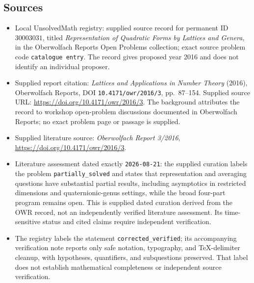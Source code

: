 \documentclass[11pt]{article}
\begin{document}
\subsection{Sources}
\begin{itemize}
\item Local UnsolvedMath registry: supplied source record for permanent ID \(30003031\), titled \emph{Representation of Quadratic Forms by Lattices and Genera}, in the Oberwolfach Reports Open Problems collection; exact source problem code \texttt{catalogue entry}. The record gives proposed year 2016 and does not identify an individual proposer.
\item Supplied report citation: \emph{Lattices and Applications in Number Theory} (2016), Oberwolfach Reports, DOI \texttt{10.4171/owr/2016/3}, pp.\ 87--154. Supplied source URL: \url{https://doi.org/10.4171/owr/2016/3}. The background attributes the record to workshop open-problem discussions documented in Oberwolfach Reports; no exact problem page or passage is supplied.
\item Supplied literature source: \emph{Oberwolfach Report 3/2016}, \url{https://doi.org/10.4171/owr/2016/3}.
\item Literature assessment dated exactly \texttt{2026-08-21}: the supplied curation labels the problem \texttt{partially\_solved} and states that representation and averaging questions have substantial partial results, including asymptotics in restricted dimensions and quaternionic-genus settings, while the broad four-part program remains open. This is supplied dated curation derived from the OWR record, not an independently verified literature assessment. Its time-sensitive status and cited claims require independent verification.
\item The registry labels the statement \texttt{corrected\_verified}; its accompanying verification note reports only safe notation, typography, and TeX-delimiter cleanup, with hypotheses, quantifiers, and subquestions preserved. That label does not establish mathematical completeness or independent source verification.
\end{itemize}
\end{document}
